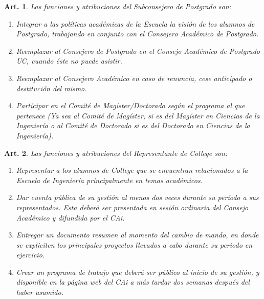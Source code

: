 \documentclass[letterpaper,11pt]{article}
\theoremstyle{plain}
\newtheorem{art}{Art.} %
\begin{document}
		\begin{art}
			Las funciones y atribuciones del Subconsejero de Postgrado son:
			\begin{enumerate}
				\item Integrar a las políticas académicas de la Escuela la visión de los alumnos de Postgrado, trabajando en conjunto con el Consejero Académico de Postgrado.
				\item Reemplazar al Consejero de Postgrado en el Consejo Académico de Postgrado UC, cuando éste no puede asistir.
				\item Reemplazar al Consejero Académico en caso de renuncia, cese anticipado o destitución del mismo.
				\item Participar en el Comité de Magíster/Doctorado según el programa al que pertenece (Ya sea al Comité de Magíster, si es del Magíster en Ciencias de la Ingeniería o al Comité de Doctorado si es del Doctorado en Ciencias de la Ingeniería).
			\end{enumerate}
		\end{art}

		\begin{art}\label{representanteCollege}
			Las funciones y atribuciones del Representante de College son:
			\begin{enumerate}
				\item Representar a los alumnos de College que se encuentran relacionados a la Escuela de Ingeniería principalmente en temas académicos.
				\item Dar cuenta pública de su gestión al menos dos veces durante su período a sus representados. Esta deberá ser presentada en sesión ordinaria del Consejo Académico y difundida por el CAi.
				\item Entregar un documento resumen al momento del cambio de mando, en donde se expliciten los principales proyectos llevados a cabo durante su periodo en ejercicio. 
				\item Crear un programa de trabajo que deberá ser público al inicio de su gestión, y disponible en la página web del CAi a más tardar dos semanas después del haber asumido.
			\end{enumerate}
		\end{art}
\end{document}
